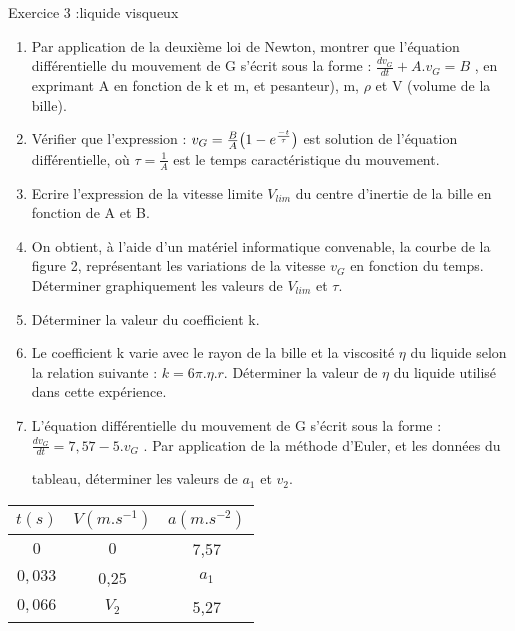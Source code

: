 \documentclass[12pt, french]{article}
\begin{document}
\begin{Box2}{Exercice 3 :liquide visqueux  }
\begin{enumerate}
	\item Par application de la deuxième loi de Newton, montrer que l’équation
		différentielle du mouvement de G s’écrit sous la forme : $\frac{dv_G}{dt} + A.v_G = B$ , en exprimant A en fonction de k et m, et
pesanteur), m, $\rho$ et V (volume de la bille).

\item Vérifier que l’expression : $v_G = \frac{B}{A}\big{(}1-e^{\frac{-t}{\tau}} \big{)}$ est solution de l’équation différentielle, où $\tau = \frac{1}{A}$ est le temps caractéristique du mouvement.

\item Ecrire l’expression de la vitesse limite $V_{lim}$ du centre d’inertie de la bille en
fonction de A et B.

\item On obtient, à l’aide d’un
matériel informatique
convenable, la courbe de
la figure 2, représentant
les variations de la vitesse
$v_G$ en fonction du temps.
Déterminer graphiquement
les valeurs de $V_{lim}$ et $\tau$.

\item Déterminer la valeur du coefficient k. 
\item Le coefficient k varie avec le rayon de la bille et la viscosité $\eta$ du liquide selon
la relation suivante : $k = 6\pi.\eta.r$.
Déterminer la valeur de $\eta$ du liquide utilisé dans cette expérience.

\item L’équation différentielle du mouvement de G s’écrit sous la forme :
$\frac{dv_G}{dt} = 7,57 - 5.v_G$ . Par application de la méthode d’Euler, et les données du

tableau, déterminer les valeurs de $a_1$ et $v_2$.
\end{enumerate}

\begin{center}
\begin{tabular}{ |c|c|c| } 
 \hline
 $t(s)$		& $V(m.s^{-1})$	 & $a(m.s^{-2})$ \\\hline
 $0$		& $0$		& 7,57 \\\hline 
 $0,033$	& 0,25	& $a_1$ \\\hline  
 $0,066$	& $V_{2}$	& 5,27 \\\hline  
 \hline
\end{tabular}
\end{center}


\end{Box2}
\end{document}
